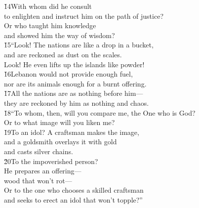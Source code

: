 \begin{poetry}
\poeml \v{14}With whom did he consult \\
\poemll    to enlighten and instruct him on the path of justice? \\
\poeml Or who taught him knowledge \\
\poemll    and showed him the way of wisdom? \\
\poeml \v{15}``Look! The nations are like a drop in a bucket, \\
\poemll    and are reckoned as dust on the scales. \\
\poeml Look! He even lifts up the islands like powder! \\
\poeml \v{16}Lebanon would not provide enough fuel, \\
\poemll    nor are its animals enough for a burnt offering. \\
\poeml \v{17}All the nations are as nothing before him--- \\
\poemll    they are reckoned by him as nothing and chaos. \\
\poeml \v{18}``To whom, then, will you compare me, the One who is God? \\
\poemll    Or to what image will you liken me? \\
\poeml \v{19}To an idol? A craftsman makes the image, \\
\poemll    and a goldsmith overlays it with gold \\
\poemlll       and casts silver chains. \\
\poeml \v{20}To the impoverished person? \\
\poemll    He prepares an offering--- \\
\poemlll       wood that won't rot--- \\
\poeml Or to the one who chooses a skilled craftsman \\
\poemll    and seeks to erect an idol that won't topple?''

\end{poetry}
